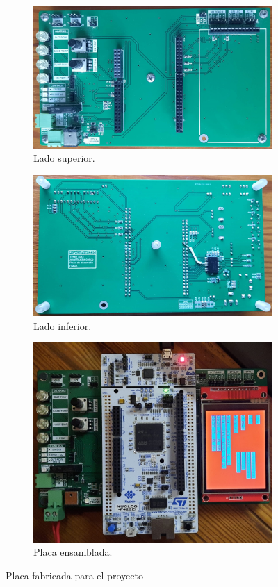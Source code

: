 \begin{figure}[H]
     \centering
     \begin{subfigure}{\textwidth}
         \centering
         \includegraphics[width=.65\textwidth]{./Figures/placa2.jpg}
         \caption{Lado superior.}
         \label{fig:placa1}
     \end{subfigure}
     \begin{subfigure}{\textwidth}
         \centering
         \includegraphics[width=.65\textwidth]{./Figures/placa3.jpg}
         \caption{Lado inferior.}
         \label{fig:placa2}
     \end{subfigure}
     \begin{subfigure}{\textwidth}
         \centering
         \includegraphics[width=.65\textwidth]{./Figures/placa1.jpg}
         \caption{Placa ensamblada.}
         \label{fig:placa3}
     \end{subfigure}
        \caption{Placa fabricada para el proyecto}
        \label{fig:three graphs}
\end{figure}

